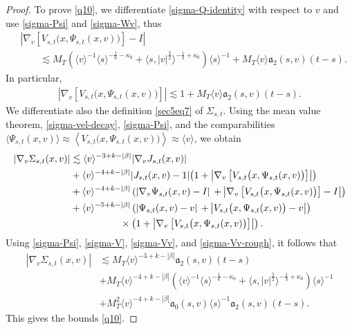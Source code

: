 \documentclass[reqno,11pt]{amsart}
\numberwithin{equation}{section}
\begin{document}
\begin{proof}
	To prove \eqref{q10}, we differentiate
	\eqref{sigma-Q-identity} with respect to $v$ and use
	\eqref{sigma-Psi} and \eqref{sigma-Wv}, thus
	\begin{equation}\label{sigma-Vv}
	\begin{split}
	&\left|\nabla_v\left[V_{s,t}\bigl(x,\Psi_{s,t}(x,v)\bigr)\right]-I\right|\\
	&\qquad\lesssim M_T\left(\langle v\rangle^{-1}\langle s\rangle^{-\frac16-\kappa_0}+
	\langle s,|v|^{\frac32}\rangle^{-\frac13+\kappa_0}\right)\langle s\rangle^{-1}+
	M_T\langle v\rangle\mathfrak a_2(s,v)(t-s).
	\end{split}
	\end{equation}
	In particular,
	\begin{align}
	\left|
	\nabla_v\left[
	V_{s,t}\bigl(x,\Psi_{s,t}(x,v)\bigr)
	\right]
	\right|
	\lesssim
	1+M_T\langle v\rangle\mathfrak a_2(s,v)(t-s).
	\label{sigma-Vv-rough}
	\end{align}
We differentiate also the definition \eqref{sec5eq7} of $\Sigma_{s,t}$. Using the mean value theorem, \eqref{sigma-vel-decay}, \eqref{sigma-Psi}, and the comparabilities $\langle\Psi_{s,t}(x,v)\rangle\approx \left\langle V_{s,t}\bigl(x,\Psi_{s,t}(x,v)\bigr)\right\rangle\approx\langle v\rangle$, we obtain
	\begin{align*}
	|\nabla_v\Sigma_{s,t}(x,v)|
	&\lesssim
	\langle v\rangle^{-3+k-|\beta|}
	|\nabla_vJ_{s,t}(x,v)|\\
	&+\langle v\rangle^{-4+k-|\beta|}
	|J_{s,t}(x,v)-1|
	{\left(1+\left|\nabla_v\left[V_{s,t}\bigl(x,\Psi_{s,t}(x,v)\bigr)\right]\right|\right)}\\
	&+\langle v\rangle^{-4+k-|\beta|}\left(|\nabla_v\Psi_{s,t}(x,v)-I|
	\right.\left.+\left|
	\nabla_v\left[
	V_{s,t}\bigl(x,\Psi_{s,t}(x,v)\bigr)
	\right]-I
	\right|
	\right)\\
	&+\langle v\rangle^{-5+k-|\beta|}
	\left(|\Psi_{s,t}(x,v)-v|
	\right.\left.+\left|
	V_{s,t}\bigl(x,\Psi_{s,t}(x,v)\bigr)-v
	\right|
	\right)\\
	&\hspace{18mm}\times
	\left(
	1+
	\left|
	\nabla_v\left[
	V_{s,t}\bigl(x,\Psi_{s,t}(x,v)\bigr)
	\right]
	\right|
	\right).
	\end{align*}
	Using \eqref{sigma-Psi}, \eqref{sigma-V},
	\eqref{sigma-Vv}, and \eqref{sigma-Vv-rough}, it follows that
	\begin{align*}
	|\nabla_v\Sigma_{s,t}(x,v)|
	&\lesssim
	M_T\langle v\rangle^{-3+k-|\beta|}
	\mathfrak a_2(s,v)(t-s)\\
	&+M_T\langle v\rangle^{-4+k-|\beta|}
	\left(
	\langle v\rangle^{-1}\langle s\rangle^{-\frac16-\kappa_0}
	+
	\langle s,|v|^{\frac32}\rangle^{-\frac13+\kappa_0}
	\right)
	\langle s\rangle^{-1}\\
	&+M_T^2\langle v\rangle^{-4+k-|\beta|}
	\mathfrak a_0(s,v)\langle s\rangle^{-1}
	\mathfrak a_2(s,v)(t-s).
	\end{align*}
	This gives the bounds \eqref{q10}.


\end{proof}
\end{document}

